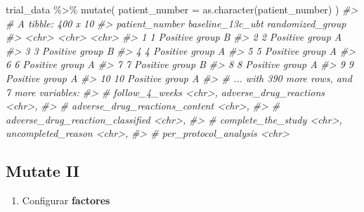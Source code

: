 \documentclass[
]{book}
\newenvironment{Shaded}{\begin{snugshade}}{\end{snugshade}}
\newcommand{\AttributeTok}[1]{\textcolor[rgb]{0.77,0.63,0.00}{#1}}
\newcommand{\CommentTok}[1]{\textcolor[rgb]{0.56,0.35,0.01}{\textit{#1}}}
\newcommand{\FunctionTok}[1]{\textcolor[rgb]{0.00,0.00,0.00}{#1}}
\newcommand{\NormalTok}[1]{#1}
\newcommand{\SpecialCharTok}[1]{\textcolor[rgb]{0.00,0.00,0.00}{#1}}
\providecommand{\tightlist}{%
  \setlength{\itemsep}{0pt}\setlength{\parskip}{0pt}}
\begin{document}
\begin{Shaded}
\begin{Highlighting}[]
\NormalTok{trial\_data }\SpecialCharTok{\%\textgreater{}\%} 
  \FunctionTok{mutate}\NormalTok{(}
    \AttributeTok{patient\_number =} \FunctionTok{as.character}\NormalTok{(patient\_number)}
\NormalTok{  )}
\CommentTok{\#\textgreater{} \# A tibble: 400 x 10}
\CommentTok{\#\textgreater{}    patient\_number baseline\_13c\_ubt randomized\_group}
\CommentTok{\#\textgreater{}    \textless{}chr\textgreater{}          \textless{}chr\textgreater{}            \textless{}chr\textgreater{}           }
\CommentTok{\#\textgreater{}  1 1              Positive         group B         }
\CommentTok{\#\textgreater{}  2 2              Positive         group A         }
\CommentTok{\#\textgreater{}  3 3              Positive         group B         }
\CommentTok{\#\textgreater{}  4 4              Positive         group A         }
\CommentTok{\#\textgreater{}  5 5              Positive         group A         }
\CommentTok{\#\textgreater{}  6 6              Positive         group A         }
\CommentTok{\#\textgreater{}  7 7              Positive         group B         }
\CommentTok{\#\textgreater{}  8 8              Positive         group A         }
\CommentTok{\#\textgreater{}  9 9              Positive         group A         }
\CommentTok{\#\textgreater{} 10 10             Positive         group A         }
\CommentTok{\#\textgreater{} \# ... with 390 more rows, and 7 more variables:}
\CommentTok{\#\textgreater{} \#   follow\_4\_weeks \textless{}chr\textgreater{}, adverse\_drug\_reactions \textless{}chr\textgreater{},}
\CommentTok{\#\textgreater{} \#   adverse\_drug\_reactions\_content \textless{}chr\textgreater{},}
\CommentTok{\#\textgreater{} \#   adverse\_drug\_reaction\_classified \textless{}chr\textgreater{},}
\CommentTok{\#\textgreater{} \#   complete\_the\_study \textless{}chr\textgreater{}, uncompleted\_reason \textless{}chr\textgreater{},}
\CommentTok{\#\textgreater{} \#   per\_protocol\_analysis \textless{}chr\textgreater{}}
\end{Highlighting}
\end{Shaded}

\hypertarget{mutate-ii}{%
\subsection{Mutate II}\label{mutate-ii}}

\begin{enumerate}
\def\labelenumi{\arabic{enumi}.}
\setcounter{enumi}{1}
\tightlist
\item
  Configurar \textbf{factores}
\end{enumerate}
\end{document}
